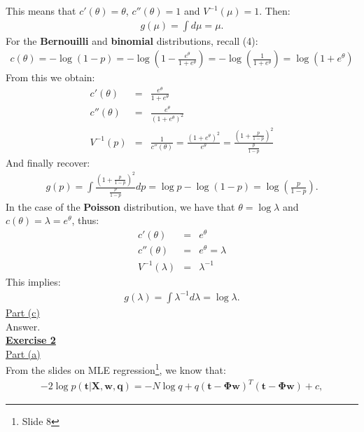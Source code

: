 \documentclass[a4paper, 11pt]{article}
\begin{document}
This means that $c'(\theta) = \theta$, $c''(\theta) = 1$ and $V^{-1}(\mu) = 1$. Then:
\begin{eqnarray}
g(\mu) = \int d\mu = \mu. \nonumber
\end{eqnarray}
For the \textbf{Bernouilli} and \textbf{binomial} distributions, recall (4):
\begin{eqnarray}
c(\theta) = -\log{(1-p)} = -\log{\left( 1 - \frac{e^\theta}{1+e^\theta} \right)} = -\log{\left( \frac{1}{1+e^\theta} \right)} = \log{(1 + e^\theta)} \nonumber
\end{eqnarray}
From this we obtain:
\begin{eqnarray}
c'(\theta) &=& \frac{e^\theta}{1 + e^\theta} \nonumber \\
c''(\theta) &=& \frac{e^\theta}{(1 + e^\theta)^2}\nonumber \\
V^{-1}(p) &=& \frac{1}{c''(\theta)} = \frac{(1 + e^\theta)^2}{e^\theta} = \frac{\left(1 + \frac{p}{1-p}\right)^2}{\frac{p}{1-p}} \nonumber
\end{eqnarray}
And finally recover:
\begin{eqnarray}
g(p) = \int \frac{(1 + \frac{p}{1-p})^2}{\frac{p}{1-p}} dp = \log p - \log{(1-p)} = \log{\left(\frac{p}{1-p}\right)}. \nonumber
\end{eqnarray}
In the case of the \textbf{Poisson} distribution, we have that $\theta = \log \lambda$ and $c(\theta) = \lambda = e^{\theta}$, thus:
\begin{eqnarray}
c'(\theta) &=& e^{\theta} \nonumber \\
c''(\theta) &=& e^{\theta}  = \lambda \nonumber \\
V^{-1}(\lambda) &=& \lambda^{-1} \nonumber
\end{eqnarray}
This implies:
\begin{eqnarray}
g(\lambda) = \int \lambda^{-1} d\lambda = \log \lambda. \nonumber
\end{eqnarray}
\newline \underline{Part (c)}\\
\newline Answer. \\
\newpage
\textbf{\underline{Exercise 2}}\\
\newline \underline{Part (a)}\\
\newline From the slides on MLE regression\footnote{Slide 8}, we know that:
\begin{eqnarray}
-2 \log p(\mathbf{t} | \mathbf{X}, \mathbf{w}, \mathbf{q}) = -N \log q + q (\mathbf{t} - \mathbf{\Phi w})^T (\mathbf{t} - \mathbf{\Phi w}) + c, \nonumber
\end{eqnarray}
\end{document}

